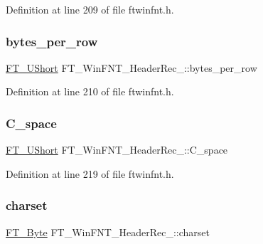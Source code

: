 Definition at line 209 of file ftwinfnt.\+h.

\mbox{\label{struct_f_t___win_f_n_t___header_rec___ac9679659e7ca5d8e95be0f6262253e8a}} 
\subsubsection{\texorpdfstring{bytes\_per\_row}{bytes\_per\_row}}
{\footnotesize\ttfamily \mbox{\hyperlink{fttypes_8h_a937f6c17cf5ffd09086d8610c37b9f58}{F\+T\+\_\+\+U\+Short}} F\+T\+\_\+\+Win\+F\+N\+T\+\_\+\+Header\+Rec\+\_\+\+::bytes\+\_\+per\+\_\+row}



Definition at line 210 of file ftwinfnt.\+h.

\mbox{\label{struct_f_t___win_f_n_t___header_rec___a1173b4d5c809db01edf4ff2185e1d43b}} 
\subsubsection{\texorpdfstring{C\_space}{C\_space}}
{\footnotesize\ttfamily \mbox{\hyperlink{fttypes_8h_a937f6c17cf5ffd09086d8610c37b9f58}{F\+T\+\_\+\+U\+Short}} F\+T\+\_\+\+Win\+F\+N\+T\+\_\+\+Header\+Rec\+\_\+\+::\+C\+\_\+space}



Definition at line 219 of file ftwinfnt.\+h.

\mbox{\label{struct_f_t___win_f_n_t___header_rec___a930b0d2d600321443de3164fc55fcbcd}} 
\subsubsection{\texorpdfstring{charset}{charset}}
{\footnotesize\ttfamily \mbox{\hyperlink{fttypes_8h_a51f26183ca0c9f4af958939648caeccd}{F\+T\+\_\+\+Byte}} F\+T\+\_\+\+Win\+F\+N\+T\+\_\+\+Header\+Rec\+\_\+\+::charset}



